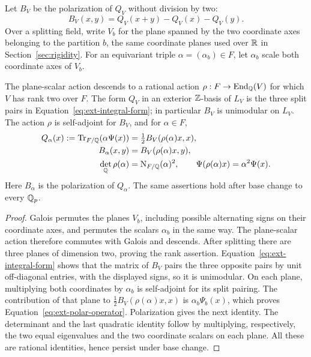 Let \(B_V\) be the polarization of \(Q_V\) without division by two:
\[
 B_V(x,y)=Q_V(x+y)-Q_V(x)-Q_V(y).
\]
Over a splitting field, write \(V_b\) for the plane spanned by the
two coordinate axes belonging to the partition \(b\), the same
coordinate planes used over \(\mathbb R\) in Section~\ref{sec:rigidity}.
For an equivariant triple \(\alpha=(\alpha_b)\in F\), let \(\alpha_b\)
scale both coordinate axes of \(V_b\).

\begin{lemma}
\label{lem:ext-quadratic-structure}
The plane-scalar action descends to a rational action
\(\rho:F\to\operatorname{End}_{\mathbb Q}(V)\) for which \(V\) has rank two over \(F\).
The form \(Q_V\) in an exterior \(\mathbb Z\)-basis of \(L_V\) is the three
split pairs in Equation~\eqref{eq:ext-integral-form}; in particular
\(B_V\) is unimodular on \(L_V\).  The action \(\rho\) is self-adjoint
for \(B_V\), and for \(\alpha\in F\),
\begin{align}
 Q_\alpha(x):=\operatorname{Tr}_{F/\mathbb Q}(\alpha\Psi(x))
    &=\tfrac12 B_V(\rho(\alpha)x,x), \label{eq:ext-polar-operator}\\
 B_\alpha(x,y)&=B_V(\rho(\alpha)x,y), \notag\\
 \det_{\mathbb Q}\rho(\alpha)&=\operatorname{N}_{F/\mathbb Q}(\alpha)^2,\qquad
 \Psi(\rho(\alpha)x)=\alpha^2\Psi(x). \label{eq:ext-rank-two}
\end{align}
Here \(B_\alpha\) is the polarization of \(Q_\alpha\).
The same assertions hold after base change to every \(\mathbb Q_p\).
\end{lemma}

\begin{proof}
Galois permutes the planes \(V_b\), including possible alternating
signs on their coordinate axes, and permutes the scalars \(\alpha_b\)
in the same way.  The plane-scalar action therefore commutes with
Galois and descends.  After splitting there are three planes of
dimension two, proving the rank assertion.  Equation~\eqref{eq:ext-integral-form}
shows that the matrix of \(B_V\) pairs the three opposite pairs by
unit off-diagonal entries, with the displayed signs, so it is
unimodular.  On each plane, multiplying both coordinates by
\(\alpha_b\) is self-adjoint for its split pairing.  The contribution
of that plane to \(\frac12B_V(\rho(\alpha)x,x)\) is
\(\alpha_b\Psi_b(x)\), which proves
Equation~\eqref{eq:ext-polar-operator}.  Polarization gives the next
identity.  The determinant and the last quadratic identity follow
by multiplying, respectively, the two equal eigenvalues and the
two coordinate scalars on each plane.  All these are rational
identities, hence persist under base change.
\end{proof}

